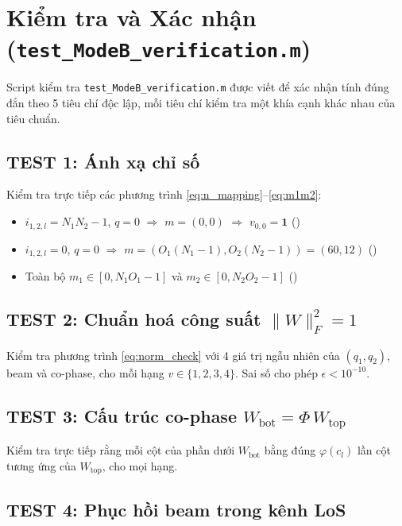 \documentclass[11pt,a4paper]{article}
\begin{document}
\section{Kiểm tra và Xác nhận (\texttt{test\_ModeB\_verification.m})}

Script kiểm tra \texttt{test\_ModeB\_verification.m} được viết để xác nhận
tính đúng đắn theo 5 tiêu chí độc lập, mỗi tiêu chí kiểm tra một khía cạnh
khác nhau của tiêu chuẩn.

\subsection{TEST 1: Ánh xạ chỉ số}

Kiểm tra trực tiếp các phương trình \eqref{eq:n_mapping}--\eqref{eq:m1m2}:
\begin{itemize}
  \item $i_{1,2,l} = N_1N_2 - 1$, $q=0$ $\Rightarrow$ $m=(0,0)$ $\Rightarrow$ $v_{0,0} = \mathbf{1}$ (\checkmark)
  \item $i_{1,2,l} = 0$, $q=0$ $\Rightarrow$ $m=(O_1(N_1{-}1), O_2(N_2{-}1)) = (60, 12)$ (\checkmark)
  \item Toàn bộ $m_1 \in [0, N_1 O_1{-}1]$ và $m_2 \in [0, N_2 O_2{-}1]$ (\checkmark)
\end{itemize}

\subsection{TEST 2: Chuẩn hoá công suất $\|W\|_F^2 = 1$}

Kiểm tra phương trình \eqref{eq:norm_check} với 4 giá trị ngẫu nhiên của
$(q_1, q_2)$, beam và co-phase, cho mỗi hạng $v \in \{1,2,3,4\}$.
Sai số cho phép $\epsilon < 10^{-10}$.

\subsection{TEST 3: Cấu trúc co-phase $W_\text{bot} = \Phi\,W_\text{top}$}

Kiểm tra trực tiếp rằng mỗi cột của phần dưới $W_\text{bot}$ bằng đúng
$\varphi(c_l)$ lần cột tương ứng của $W_\text{top}$, cho mọi hạng.

\subsection{TEST 4: Phục hồi beam trong kênh LoS}
\end{document}
